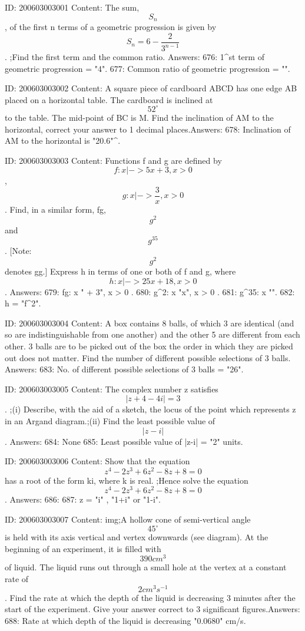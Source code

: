 \documentclass{article}
\begin{document}
ID: 200603003001
Content:
The sum, $$S_{n}$$ , of the first n terms of a geometric progression is given by $$S_{n}=6- \frac{2}{3^{n-1}} $$. ;Find the first term and the common ratio. Answers:
676: 1^{st}  term of geometric progression = "4".
677: Common ratio of geometric progression = "".

ID: 200603003002
Content:
A square piece of cardboard ABCD has one edge AB placed on a horizontal table. The cardboard is inclined at $$52 ^ {\circ}$$ to the table. The mid-point of BC is M. Find the inclination of AM to the horizontal, correct your answer to 1 decimal places.Answers:
678: Inclination of AM to the horizontal is "20.6"^{\circ}.

ID: 200603003003
Content:
Functions f and g are defined by $$f:x|->5x+3,x>0$$, $$g:x|->\frac{3}{x},x>0$$. Find, in a similar form, fg, $$g^{2}$$ and $$g^{35}$$.  [Note: $$g^{2}$$ denotes gg.] Express h in terms of one or both of f and g, where $$h:x|->25x+18,x>0$$. Answers:
679: fg: x \mapsto " + 3", x > 0 .
680: g^2: x \mapsto "x", x > 0 .
681: g^{35}: x \mapsto "".
682: h = "f^2".

ID: 200603003004
Content:
A box contains 8 balls, of which 3 are identical (and so are indistinguishable from one another) and the other 5 are different from each other. 3 balls are to be picked out of the box  the order in which they are picked out does not matter. Find the number of different possible selections of 3 balls. Answers:
683: No. of different possible selections of 3 balls = "26".

ID: 200603003005
Content:
The complex number z satisfies $$|z+4-4i|=3$$. ;(i) Describe, with the aid of a sketch, the locus of the point which represents z in an Argand diagram.;(ii) Find the least possible value of $$|z-i|$$ .  Answers:
684: None
685: Least possible value of |z-i| = "2" units.

ID: 200603003006
Content:
Show that the equation $$z^{4}-2z^{3}+6z^{2}-8z+8=0$$ has a root of the form ki, where k is real. ;Hence solve the equation $$z^{4}-2z^{3}+6z^{2}-8z+8=0$$. Answers:
686: 
687: z = \pm"i" , "1+i" or "1-i".

ID: 200603003007
Content:
img;A hollow cone of semi-vertical angle $$45^{\circ}$$ is held with its axis vertical and vertex downwards (see diagram). At the beginning of an experiment, it is filled with $$390 cm^{3}$$ of liquid. The liquid runs out through a small hole at the vertex at a constant rate of $$2 cm^{3}s^{-1}$$. Find the rate at which the depth of the liquid is decreasing 3 minutes after the start of the experiment. Give your answer correct to 3 significant figures.Answers:
688: Rate at which depth of the liquid is decreasing "0.0680" cm/s.
\end{document}
